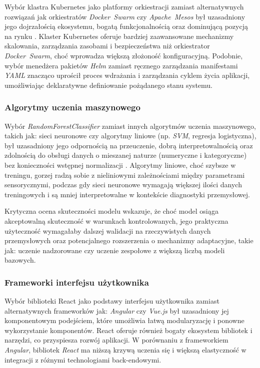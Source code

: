 Wybór klastra Kubernetes jako platformy orkiestracji zamiast alternatywnych rozwiązań jak orkiestratów \textit{\mbox{Docker Swarm}} czy \textit{\mbox{Apache Mesos}} był uzasadniony jego dojrzałością ekosystemu, bogatą funkcjonalnością oraz dominującą pozycją na rynku \cite{kubernetes_benefits}. Klaster Kubernetes oferuje bardziej zaawansowane mechanizmy skalowania, zarządzania zasobami i bezpieczeństwa niż orkiestrator \textit{\mbox{Docker Swarm}}, choć wprowadza większą złożoność konfiguracyjną. Podobnie, wybór menedżera pakietów \textit{\mbox{Helm}} \cite{helm_docs} zamiast ręcznego zarządzania manifestami \textit{YAML} \cite{yaml_spec} znacząco uprościł proces wdrażania i zarządzania cyklem życia aplikacji, umożliwiając deklaratywne definiowanie pożądanego stanu systemu.

\subsubsection{Algorytmy uczenia maszynowego}

Wybór \textit{\mbox{RandomForestClassifier}} zamiast innych algorytmów uczenia maszynowego, takich jak: sieci neuronowe czy algorytmy liniowe (np. \textit{\mbox{SVM}}, regresja logistyczna), był uzasadniony jego odpornością na przeuczenie, dobrą interpretowalnością oraz zdolnością do obsługi danych o mieszanej naturze (numeryczne i kategoryczne) bez konieczności wstępnej normalizacji \cite{spark_mllib_reference}. Algorytmy liniowe, choć szybsze w treningu, gorzej radzą sobie z nieliniowymi zależnościami między parametrami sensorycznymi, podczas gdy sieci neuronowe wymagają większej ilości danych treningowych i są mniej interpretowalne w kontekście diagnostyki przemysłowej.

Krytyczna ocena skuteczności modelu wskazuje, że choć model osiąga akceptowalną skuteczność w warunkach kontrolowanych, jego praktyczna użyteczność wymagałaby dalszej walidacji na rzeczywistych danych przemysłowych oraz potencjalnego rozszerzenia o mechanizmy adaptacyjne, takie jak: uczenie nadzorowane czy uczenie zespołowe z większą liczbą modeli bazowych.

\subsubsection{Frameworki interfejsu użytkownika}

Wybór biblioteki React jako podstawy interfejsu użytkownika zamiast alternatywnych frameworków jak: \textit{\mbox{Angular}} czy \textit{\mbox{Vue.js}} był uzasadniony jej komponentowym podejściem, które umożliwia łatwą modularyzację i ponowne wykorzystanie komponentów. React oferuje również bogaty ekosystem bibliotek i narzędzi, co przyspiesza rozwój aplikacji. W porównaniu z frameworkiem \textit{\mbox{Angular}}, bibliotek \textit{\mbox{React}} ma niższą krzywą uczenia się i większą elastyczność w integracji z różnymi technologiami back-endowymi.

